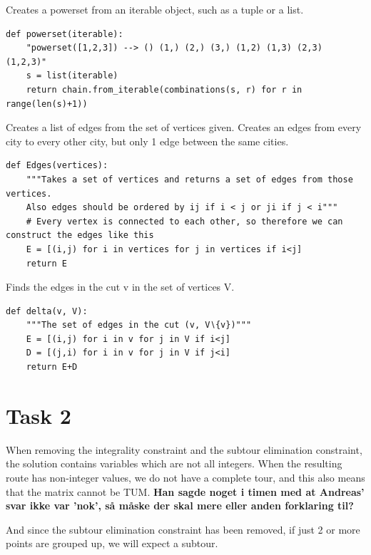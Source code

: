 \documentclass[a4paper,10pt]{article}
\begin{document}
Creates a powerset from an iterable object, such as a tuple or a list.

\begin{lstlisting}
def powerset(iterable):
    "powerset([1,2,3]) --> () (1,) (2,) (3,) (1,2) (1,3) (2,3) (1,2,3)"
    s = list(iterable)
    return chain.from_iterable(combinations(s, r) for r in range(len(s)+1))
\end{lstlisting}

Creates a list of edges from the set of vertices given. Creates an edges from every city to every other city, but only 1 edge between the same cities.

\begin{lstlisting}
def Edges(vertices):
    """Takes a set of vertices and returns a set of edges from those vertices. 
    Also edges should be ordered by ij if i < j or ji if j < i"""
    # Every vertex is connected to each other, so therefore we can construct the edges like this
    E = [(i,j) for i in vertices for j in vertices if i<j]
    return E
\end{lstlisting}

Finds the edges in the cut v in the set of vertices V.

\begin{lstlisting}
def delta(v, V):
    """The set of edges in the cut (v, V∖{v})"""
    E = [(i,j) for i in v for j in V if i<j]
    D = [(j,i) for i in v for j in V if j<i]
    return E+D
\end{lstlisting}


\newpage
\section*{Task 2}

When removing the integrality constraint and the subtour elimination constraint, the solution contains variables which are not all integers. When the resulting route has non-integer values, we do not have a complete tour, and this also means that the matrix cannot be TUM. \textbf{Han sagde noget i timen med at Andreas' svar ikke var 'nok', så måske der skal mere eller anden forklaring til?}

And since the subtour elimination constraint has been removed, if just 2 or more points are grouped up, we will expect a subtour.

\newpage
\end{document}
